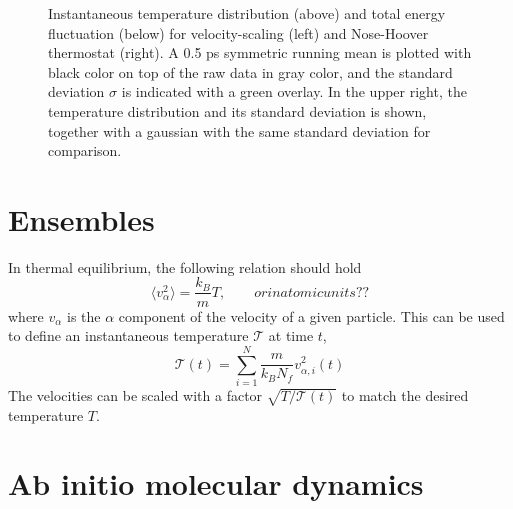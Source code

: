 \documentclass[11pt,bibliography=totoc,index=totoc]{scrbook}   %
\begin{document}
\begin{figure}[htbp]
  \centering
  \caption{
    Instantaneous temperature distribution (above) and total energy fluctuation (below) 
    for velocity-scaling (left) and Nose-Hoover thermostat (right). A 0.5 ps symmetric running mean 
    is plotted with black color on top of the raw data in gray color, and the standard deviation $\sigma$ 
    is indicated with a green overlay. In the upper right, the temperature distribution and its 
    standard deviation is shown, together with a gaussian with the same standard deviation for comparison.
   }
  \label{fig:md_test_temperature}
\end{figure}

\section{Ensembles}

In thermal equilibrium, the following relation should hold
\begin{equation}
  \langle v_{\alpha}^2 \rangle = \frac{k_B}{m} T, \qquad{or in atomic units??}
\end{equation}
where $v_{\alpha}$ is the $\alpha$ component of the velocity of a given particle.
This can be used to define an instantaneous temperature $\mathcal{T}$ at time $t$,
\begin{equation}
  \mathcal{T}(t) = \sum_{i=1}^N \frac{m}{k_B N_f} v_{\alpha,i}^2(t)
\end{equation}
The velocities can be scaled with a factor $\sqrt{T/\mathcal{T}(t)}$ to match the desired temperature $T$.




\section{Ab initio molecular dynamics}

\end{document}
